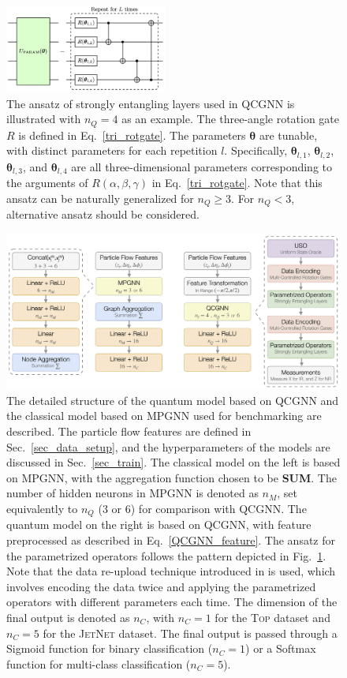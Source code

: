 \documentclass[reprint,amsmath,amssymb,prd,nofootinbib]{revtex4-2}
\def\thetabf{\boldsymbol{\theta}}
\newcommand{\Top}{\textsc{Top}\xspace}
\newcommand{\JetNet}{\textsc{JetNet}\xspace}
\begin{document}
\begin{figure}[htbp]
    \centering
    \includegraphics[width=0.475\textwidth]{fig_qc_vqc.png}
    \caption{The ansatz of strongly entangling layers \cite{strong_ent} used in QCGNN is illustrated with $n_Q=4$ as an example. The three-angle rotation gate $R$ is defined in Eq.~\ref{tri_rotgate}. The parameters $\thetabf$ are tunable, with distinct parameters for each repetition $l$. Specifically, $\thetabf_{l,1}$, $\thetabf_{l,2}$, $\thetabf_{l,3}$, and $\thetabf_{l,4}$ are all three-dimensional parameters corresponding to the arguments of $R(\alpha, \beta, \gamma)$ in Eq.~\ref{tri_rotgate}. Note that this ansatz can be naturally generalized for $n_Q \ge 3$. For $n_Q < 3$, alternative ansatz should be considered.}
    \label{fig:exvqc}
\end{figure}

\begin{figure}[htbp]
    \centering
    \includegraphics[width=\textwidth]{fig_model_structure.png}
    \caption{The detailed structure of the quantum model based on QCGNN and the classical model based on MPGNN used for benchmarking are described. The particle flow features are defined in Sec.~\ref{sec_data_setup}, and the hyperparameters of the models are discussed in Sec.~\ref{sec_train}. The classical model on the left is based on MPGNN, with the aggregation function chosen to be \textbf{SUM}. The number of hidden neurons in MPGNN is denoted as $n_M$, set equivalently to $n_Q$ (3 or 6) for comparison with QCGNN. The quantum model on the right is based on QCGNN, with feature preprocessed as described in Eq.~\ref{QCGNN_feature}. The ansatz for the parametrized operators follows the pattern depicted in Fig.~\ref{fig:exvqc}. Note that the data re-upload technique introduced in \cite{reupload} is used, which involves encoding the data twice and applying the parametrized operators with different parameters each time. The dimension of the final output is denoted as $n_C$, with $n_C=1$ for the \Top dataset and $n_C=5$ for the \JetNet dataset. The final output is passed through a Sigmoid function for binary classification ($n_C=1$) or a Softmax function for multi-class classification ($n_C=5$).}
    \label{fig:models}
\end{figure}
\end{document}
